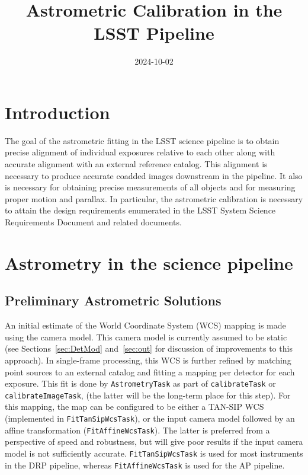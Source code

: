 \documentclass[DM,authoryear,toc]{lsstdoc}
\title{Astrometric Calibration in the LSST Pipeline}
\date{2024-10-02}
\begin{document}
\maketitle

\section{Introduction}
The goal of the astrometric fitting in the LSST science pipeline  is to obtain precise alignment of individual exposures relative to each other along with accurate alignment with an external reference catalog. This alignment is necessary to produce accurate coadded images downstream in the pipeline. It also is necessary for obtaining precise measurements of all objects and for measuring proper motion and parallax. In particular, the astrometric calibration is necessary to attain the design requirements enumerated in the LSST System Science Requirements Document  and related documents.

\section{Astrometry in the science pipeline}
\subsection{Preliminary Astrometric Solutions}
An initial estimate of the World Coordinate System (WCS) mapping is made using the camera model. This camera model is currently assumed to be static (see Sections~\ref{sec:DetMod} and~\ref{sec:out} for discussion of improvements to this approach). In single-frame processing, this WCS is further refined by matching point sources to an external catalog and fitting a mapping per detector for each exposure. This fit is done by \texttt{AstrometryTask} as part of \texttt{calibrateTask} or \texttt{calibrateImageTask}, (the latter will be the long-term place for this step). For this mapping, the map can be configured to be either a TAN-SIP WCS \citep{2005ASPC..347..491S} (implemented in \texttt{FitTanSipWcsTask}), or the input camera model followed by an affine transformation (\texttt{FitAffineWcsTask}). The latter is preferred from a perspective of speed and robustness, but will give poor results if the input camera model is not sufficiently accurate. \texttt{FitTanSipWcsTask} is used for most instruments in the DRP pipeline, whereas \texttt{FitAffineWcsTask} is used for the AP pipeline.
\end{document}
